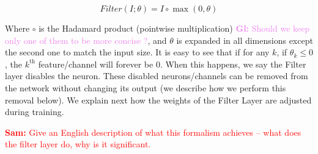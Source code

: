 \documentclass[sigconf]{acmart}
\newcommand{\srm}[1]{\textcolor{red}{{\bf Sam:} #1}}
\newcommand{\gl}[1]{\textcolor{violet}{{\bf Gl:} #1}}
\begin{document}
\begin{equation} Filter(I;\theta) = I \circ \max(0, \theta) \end{equation}

Where $\circ$ is the Hadamard product (pointwise multiplication) \gl{Should we
  keep only one of them to be more concise ?}, and $\theta$ is expanded in all
dimensions except the second one to match the input size. It is easy to see
that if for any $k$, if $\theta_k \leq 0$, the $k^{\text{th}}$ feature/channel
will forever be $0$. When this happens, we say the Filter layer disables the
neuron. These disabled neurons/channels can be removed from the network without
changing its output (we describe how we perform this removal below). We explain
next how the weights of the Filter Layer are adjusted during training.


\srm{Give an English description of what this formalism
achieves -- what does the filter layer do, why is it significant.}


%
%
%
\end{document}
